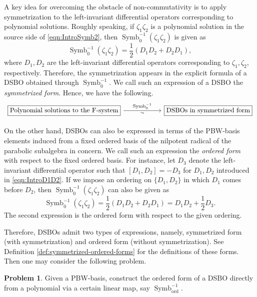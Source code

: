 \documentclass[a4paper,11pt,reqno]{amsart}
\newcommand{\0}{{\bf 0}}
\newcommand{\1}{{\bf 1}}
\newcommand{\ord}{{\mathrm{ord}}}
\DeclareMathOperator{\Symb}{Symb}
\theoremstyle{plain}
\theoremstyle{definition}
\numberwithin{equation}{section}
\theoremstyle{definition}
\newtheorem{problem}{Problem}
\begin{document}
A key idea for overcoming the obstacle of non-commutativity is to apply symmetrization to the left-invariant differential operators corresponding to polynomial solutions. Roughly speaking,
if $\zeta_1\zeta_2$ is a polynomial solution  
in the source side of \eqref{eqn:IntroSymb2}, then $\Symb_0^{-1}(\zeta_1\zeta_2)$ is given as
\begin{equation}\label{eqn:IntroD1D2}
\Symb_0^{-1}(\zeta_1\zeta_2) = \frac{1}{2}(D_1D_2+D_2D_1),
\end{equation}
where $D_1, D_2$ are the left-invariant differential operators
corresponding to $\zeta_1, \zeta_2$, respectively.
Therefore, the symmetrization appears in the explicit formula of 
a DSBO obtained through $\Symb_0^{-1}$.
We call such an expression of a DSBO the \emph{symmetrized form}.
Hence, we have the following.
\begin{equation}\label{eqn:IntroSymb3}
\begin{tikzcd}[column sep=1cm]
	{\fbox{Polynomial solutions to the F-system}} && {\fbox{DSBOs in symmetrized form}}
	\arrow["{\operatorname{Symb}_0^{-1}}","{\sim}"', from=1-1, to=1-3]
\end{tikzcd}
\end{equation}

On the other hand, DSBOs can also be expressed in terms of
the PBW-basis elements induced from a fixed ordered basis
of the nilpotent radical of the parabolic subalgebra in concern.
We call such an expression
the \emph{ordered form} with respect to the fixed ordered basis.
For instance, let $D_3$ denote the left-invariant differential operator 
such that $[D_1,D_2]=-D_3$ for  $D_1,D_2$ 
introduced in \eqref{eqn:IntroD1D2}. 
If we impose an ordering on $\{D_1,D_2\}$ in which $D_1$ comes
before $D_2$, then $\Symb_0^{-1}(\zeta_1\zeta_2)$ can also be given as
\begin{equation*}
\Symb_0^{-1}(\zeta_1\zeta_2) 
= \frac{1}{2}(D_1D_2+D_2D_1)=D_1D_2+\frac{1}{2}D_3.
\end{equation*}
The second expression is the ordered form with respect to the given ordering.

Therefore, DSBOs admit two types of expressions, namely, symmetrized form (with symmetrization) and  ordered form (without symmetrization).
See Definition \ref{def:symmetrized-ordered-forms} for 
the definitions of these forms.
Then one may consider the following problem.

\begin{problem}\label{prob:ordered}
Given a PBW-basis,
construct the ordered form of a DSBO directly from a polynomial
via a certain linear map, say $\Symb_{\ord}^{-1}$.
\end{problem}
\end{document}
